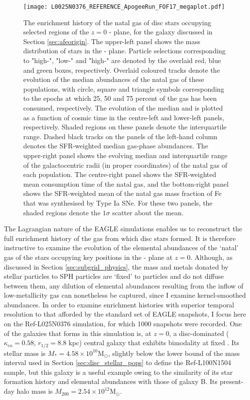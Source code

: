 \begin{figure*}
\texttt{[image: L0025N0376\_REFERENCE\_ApogeeRun\_FOF17\_megaplot.pdf]}
\caption[The history of gas (in various parameters) which forms the stellar populations of an example disk galaxy taken from the Ref-L025N0376 Simulation]{\label{fig:daddyplot} The enrichment history of the natal gas of disc stars occupying selected regions of the $z=0$ \afe{}-\feh{} plane, for the galaxy discussed in Section \ref{sec:afeorigin}. The upper-left panel shows the mass distribution of stars in the \afe{}-\feh{} plane. Particle selections corresponding to "high-\afe{}", "low-\afe{}" and "high-\feh{}" are denoted by the overlaid red, blue and green boxes, respectively. Overlaid coloured tracks denote the evolution of the median abundances of the natal gas of these populations, with circle, square and triangle symbols corresponding to the epochs at which 25, 50 and 75 percent of the gas has been consumed, respectively. The evolution of the median \afe{} and \feh{} is plotted as a function of cosmic time in the centre-left and lower-left panels, respectively. Shaded regions on these panels denote the interquartile range. Dashed black tracks on the panels of the left-hand column denotes the SFR-weighted median gas-phase abundances. The upper-right panel shows the evolving median and interquartile range of the galactocentric radii (in proper coordinates) of the natal gas of each population. The centre-right panel shows the SFR-weighted mean consumption time of the natal gas, and the bottom-right panel shows the SFR-weighted mean of the natal gas mass fraction of Fe that was synthesised by Type Ia SNe. For these two panels, the shaded regions denote the $1\sigma$ scatter about the mean.}
\end{figure*}

The Lagrangian nature of the EAGLE simulations enables us to reconstruct the full enrichment history of the gas from which disc stars formed. It is therefore instructive to examine the evolution of the elemental abundances of the `natal' gas of the stars occupying key positions in the \afe{}-\feh{} plane at $z=0$. Although, as discussed in Section \ref{sec:subgrid_physics}, the mass and metals donated by stellar particles to SPH particles are `fixed' to particles and do not diffuse between them, any dilution of elemental abundances resulting from the inflow of low-metallicity gas can nonetheless be captured, since I examine kernel-smoothed abundances. In order to examine enrichment histories with superior temporal resolution to that afforded by the standard set of EAGLE snapshots, I focus here on the Ref-L025N0376 simulation, for which 1000 snapshots were recorded. One of the galaxies that forms in this simulation is, at $z=0$, a disc-dominated ($ \kappa_{\mathrm{co}} = 0.58$, $r_{1/2} = 8.8$ kpc) central galaxy that exhibits \afe{} bimodality at fixed \feh{}. Its stellar mass is $M_{*} = 4.58\times 10^{10}\mathrm{M_{\odot}}$, slightly below the lower bound of the mass interval used in Section \ref{sec:disc_stellar_pops} to define the Ref-L100N1504 sample, but this galaxy is a useful example owing to the similarity of its star formation history and elemental abundances with those of galaxy B. Its present-day halo mass is $M_{200} = 2.54\times 10^{12}\mathrm{M_{\odot}}$.


